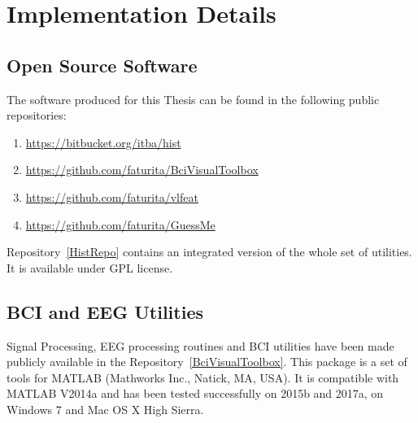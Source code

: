 \chapter{Implementation Details}
\label{chapter:eleven}

%
%
%
%
%
%

\section{Open Source Software}
The software produced for this Thesis can be found in the following public repositories:

\begin{enumerate}
\item \url{https://bitbucket.org/itba/hist}\label{HistRepo}
\item \url{https://github.com/faturita/BciVisualToolbox}\label{BciVisualToolbox}
\item \url{https://github.com/faturita/vlfeat}\label{VLFeat}
\item \url{https://github.com/faturita/GuessMe}\label{GuessMe}
\end{enumerate}

\vspace{2pt}

Repository~\ref{HistRepo} contains an integrated version of the whole set of utilities. It is available under GPL license.

\section{BCI and EEG Utilities}

Signal Processing, EEG processing routines and BCI utilities have been made publicly available in the Repository~\ref{BciVisualToolbox}.  This package is a set of tools for MATLAB (Mathworks Inc., Natick, MA, USA).  It is compatible with MATLAB V2014a and has been tested successfully on 2015b and 2017a, on Windows 7 and Mac OS X High Sierra.

